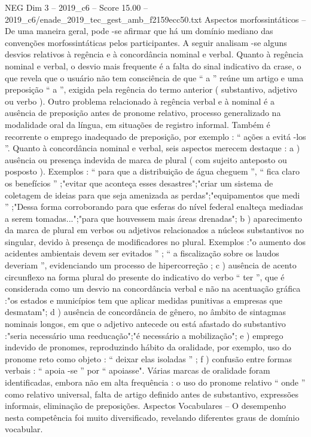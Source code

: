 \begin{textsample}{NEG Dim 3 – 2019\_c6 – Score 15.00 – 2019\_c6/enade\_2019\_tec\_gest\_amb\_f2159ecc50.txt}
Aspectos morfossintáticos – De uma maneira geral, pode -se afirmar que há um domínio mediano das convenções morfossintáticas pelos participantes.
A seguir analisam -se alguns desvios relativos à regência e à concordância nominal e verbal.
Quanto à regência nominal e verbal, o desvio mais frequente é a falta do sinal indicativo da crase, o que revela que o usuário não tem consciência de que “ a ” reúne um artigo e uma preposição “ a ”, exigida pela regência do termo anterior ( substantivo, adjetivo ou verbo ).
Outro problema relacionado à regência verbal e à nominal é a ausência de preposição antes de pronome relativo, processo generalizado na modalidade oral da língua, em situações de registro informal.
Também é recorrente o emprego inadequado de preposição, por exemplo : “ ações a evitá -los ”.
Quanto à concordância nominal e verbal, seis aspectos merecem destaque : a ) ausência ou presença indevida de marca de plural ( com sujeito anteposto ou posposto ).
Exemplos : “ para que a distribuição de água cheguem ”, “ fica claro os benefícios ” ;"evitar que aconteça esses desastres";"criar um sistema de coletagem de ideias para que seja amenizada as perdas";"equipamentos que medi ” ;"Dessa forma corroborando para que esferas do nível federal enalteça mediadas a serem tomadas...";"para que houvessem mais áreas drenadas"; b ) aparecimento da marca de plural em verbos ou adjetivos relacionados a núcleos substantivos no singular, devido à presença de modificadores no plural.
Exemplos :"o aumento dos acidentes ambientais devem ser evitados ” ; “ a fiscalização sobre os laudos deveriam ”, evidenciando um processo de hipercorreção ; c ) ausência de acento circunflexo na forma plural do presente do indicativo do verbo “ ter ”, que é considerada como um desvio na concordância verbal e não na acentuação gráfica :"os estados e municípios tem que aplicar medidas punitivas a empresas que desmatam"; d ) ausência de concordância de gênero, no âmbito de sintagmas nominais longos, em que o adjetivo antecede ou está afastado do substantivo :"seria necessário uma reeducação";"é necessário a mobilização"; e ) emprego indevido de pronomes, reproduzindo hábito da oralidade, por exemplo, uso do pronome reto como objeto : “ deixar elas isoladas ” ; f ) confusão entre formas verbais : “ apoia -se ” por “ apoiasse".
Várias marcas de oralidade foram identificadas, embora não em alta frequência : o uso do pronome relativo “ onde ” como relativo universal, falta de artigo definido antes de substantivo, expressões informais, eliminação de preposições.
Aspectos Vocabulares – O desempenho nesta competência foi muito diversificado, revelando diferentes graus de domínio vocabular.

\end{textsample}
